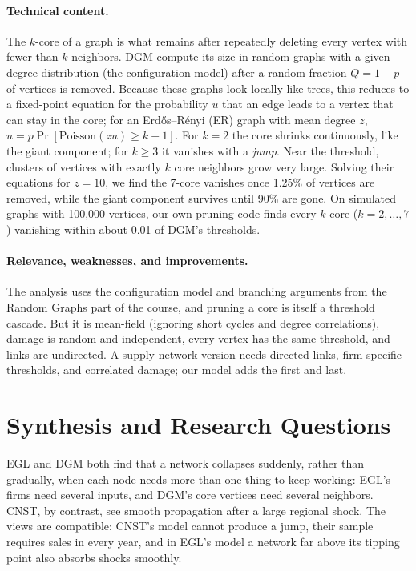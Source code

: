 \documentclass[10pt]{article}
\begin{document}
\paragraph{Technical content.} The $k$-core of a graph is what remains after repeatedly deleting every vertex with fewer than $k$ neighbors. DGM compute its size in random graphs with a given degree distribution (the configuration model) after a random fraction $Q=1-p$ of vertices is removed. Because these graphs look locally like trees, this reduces to a fixed-point equation for the probability $u$ that an edge leads to a vertex that can stay in the core; for an Erd\H{o}s--R\'enyi (ER) graph with mean degree $z$, $u=p\Pr[\mathrm{Poisson}(zu)\ge k-1]$. For $k=2$ the core shrinks continuously, like the giant component; for $k\ge3$ it vanishes with a \emph{jump}. Near the threshold, clusters of vertices with exactly $k$ core neighbors grow very large. Solving their equations for $z=10$, we find the 7-core vanishes once 1.25\% of vertices are removed, while the giant component survives until 90\% are gone. On simulated graphs with 100{,}000 vertices, our own pruning code finds every $k$-core ($k=2,\dots,7$) vanishing within about 0.01 of DGM's thresholds.

\paragraph{Relevance, weaknesses, and improvements.} The analysis uses the configuration model and branching arguments from the Random Graphs part of the course, and pruning a core is itself a threshold cascade. But it is mean-field (ignoring short cycles and degree correlations), damage is random and independent, every vertex has the same threshold, and links are undirected. A supply-network version needs directed links, firm-specific thresholds, and correlated damage; our model adds the first and last.

\section{Synthesis and Research Questions}
EGL and DGM both find that a network collapses suddenly, rather than gradually, when each node needs more than one thing to keep working: EGL's firms need several inputs, and DGM's core vertices need several neighbors. CNST, by contrast, see smooth propagation after a large regional shock. The views are compatible: CNST's model cannot produce a jump, their sample requires sales in every year, and in EGL's model a network far above its tipping point also absorbs shocks smoothly.
\end{document}
